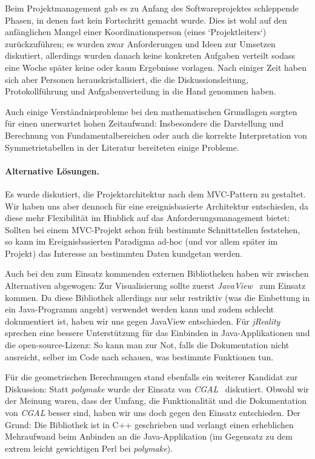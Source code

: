 \noindent Beim Projektmanagement gab es zu Anfang des Softwareprojektes schleppende Phasen, in denen fast kein Fortschritt gemacht wurde.
Dies ist wohl auf den anfänglichen Mangel einer Koordinationsperson (eines `Projektleiters`) zurückzuführen; es wurden zwar Anforderungen und
Ideen zur Umsetzen diskutiert, allerdings wurden danach keine konkreten Aufgaben verteilt sodass eine Woche später keine oder kaum Ergebnisse vorlagen. Nach einiger Zeit haben sich aber Personen herauskristallisiert, die die Diskussionsleitung, Protokollführung und Aufgabenverteilung 
in die Hand genommen haben.

Auch einige Verständnisprobleme bei den mathematischen Grundlagen sorgten für einen unerwartet hohen Zeitaufwand: Insbesondere
die Darstellung und Berechnung von Fundamentalbereichen oder auch die korrekte Interpretation von Symmetrietabellen in der Literatur
bereiteten einige Probleme. 

\paragraph{Alternative Lösungen.}
Es wurde diskutiert, die Projektarchitektur nach dem MVC-Pattern zu gestaltet. Wir haben uns aber dennoch für eine ereignisbasierte Architektur
entschieden, da diese mehr Flexibilität im Hinblick auf das Anforderungsmanagement bietet: Sollten bei einem MVC-Projekt schon früh bestimmte
Schnittstellen feststehen, so kann im Ereignisbasierten Paradigma ad-hoc (und vor allem später im Projekt) das Interesse an bestimmten Daten kundgetan werden.

\noindent Auch bei den zum Einsatz kommenden externen Bibliotheken haben wir zwischen Alternativen abgewogen: Zur Visualisierung
sollte zuerst \emph{JavaView}~\cite{javaview} zum Einsatz kommen. Da diese Bibliothek allerdings nur sehr restriktiv (was die Einbettung in ein Java-Programm angeht) verwendet werden kann und zudem schlecht dokumentiert ist, haben wir uns gegen JavaView entschieden.
Für \emph{jReality} sprechen eine bessere Unterstützung für das Einbinden in Java-Applikationen und die open-source-Lizenz: So kann man zur Not,
falls die Dokumentation nicht ausreicht, selber im Code nach schauen, was bestimmte Funktionen tun.

\noindent Für die geometrischen Berechnungen stand ebenfalls ein weiterer Kandidat zur Diskussion: Statt \emph{polymake} wurde der
Einsatz von \emph{CGAL}~\cite{cgal} diskutiert. Obwohl wir der Meinung waren, dass der Umfang, die Funktionalität und die Dokumentation von \emph{CGAL} besser sind, haben wir uns doch gegen den Einsatz entschieden. Der Grund: Die Bibliothek ist in C++ geschrieben und 
verlangt einen erheblichen Mehraufwand beim Anbinden an die Java-Applikation (im Gegensatz zu dem extrem leicht gewichtigen Perl bei \emph{polymake}).

